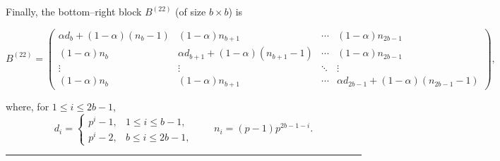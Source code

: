 \documentclass[12pt,twoside]{article}
\renewenvironment{proof}{{\noindent\bfseries Proof.}}{\qed}
\def\qed{\nolinebreak\hfill\rule{.2cm}{.2cm}\par\addvspace{.5cm}}
\begin{document}
\begin{proof}
	Finally, the bottom--right block $B^{(22)}$ (of size $b\times b$) is
	\begin{footnotesize}
		\[
	B^{(22)} =
	\begin{pmatrix}
		\alpha d_{b} + (1-\alpha)(n_{b}-1)   & (1-\alpha)n_{b+1} & \cdots & (1-\alpha)n_{2b-1}\\[2pt]
		(1-\alpha)n_{b} & \alpha d_{b+1} + (1-\alpha)(n_{b+1}-1) & \cdots & (1-\alpha)n_{2b-1}\\[2pt]
		\vdots & \vdots & \ddots & \vdots\\[2pt]
		(1-\alpha)n_{b} & (1-\alpha)n_{b+1} & \cdots &
		\alpha d_{2b-1} + (1-\alpha)(n_{2b-1}-1)
	\end{pmatrix},
	\]
	\end{footnotesize}
	 where, for $1\le i\le 2b-1$,
	\[
	d_i =
	\begin{cases}
		p^{ i}-1, & 1\le i\le b-1,\\[3pt]
		p^{ i}-2, & b\le i\le 2b-1,
	\end{cases}
	\qquad
	n_i = (p-1)p^{ 2b-1-i}.
	\]
\end{proof}
\end{document}
